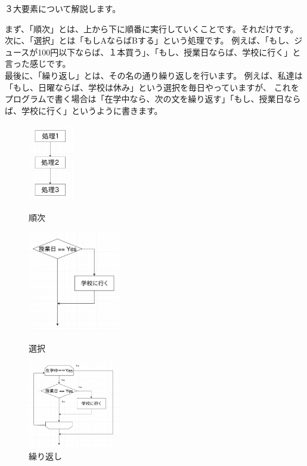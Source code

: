 \documentclass[11pt,a4paper]{jsarticle}
\begin{document}
３大要素について解説します。

まず、「順次」とは、上から下に順番に実行していくことです。それだけです。\\


次に、「選択」とは「もしAならばBする」という処理です。
例えば、「もし、ジュースが100円以下ならば、１本買う」、「もし、授業日ならば、学校に行く」と言った感じです。\\


最後に、「繰り返し」とは、その名の通り繰り返しを行います。
例えば、私達は「もし、日曜ならば、学校は休み」という選択を毎日やっていますが、
これをプログラムで書く場合は「在学中なら、次の文を繰り返す」「もし、授業日ならば、学校に行く」というように書きます。
\begin{figure}[htbp]
 \begin{minipage}{0.3\hsize}
  \begin{center}
   \includegraphics[width=20mm]{./sequential.png}
  \end{center}
  \caption{順次}
 \end{minipage}
 \begin{minipage}{0.3\hsize}
 \begin{center}
  \includegraphics[width=40mm]{./choose.png}
 \end{center}
  \caption{選択}
 \end{minipage}
 \begin{minipage}{0.3\hsize}
 \begin{center}
  \includegraphics[width=40mm]{./repetition.png}
 \end{center}
  \caption{繰り返し}
 \end{minipage}
\end{figure}
\end{document}
